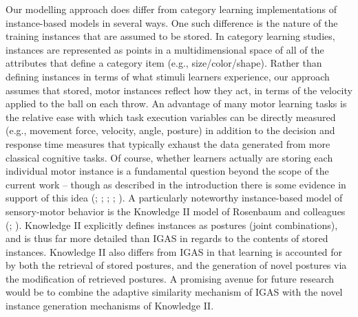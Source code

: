 \documentclass[
  11pt,
  letterpaper,
]{article}
\begin{document}
Our modelling approach does differ from category learning
implementations of instance-based models in several ways. One such
difference is the nature of the training instances that are assumed to
be stored. In category learning studies, instances are represented as
points in a multidimensional space of all of the attributes that define
a category item (e.g., size/color/shape). Rather than defining instances
in terms of what stimuli learners experience, our approach assumes that
stored, motor instances reflect how they act, in terms of the velocity
applied to the ball on each throw. An advantage of many motor learning
tasks is the relative ease with which task execution variables can be
directly measured (e.g., movement force, velocity, angle, posture) in
addition to the decision and response time measures that typically
exhaust the data generated from more classical cognitive tasks. Of
course, whether learners actually are storing each individual motor
instance is a fundamental question beyond the scope of the current work
-- though as described in the introduction there is some evidence in
support of this idea
(; ; ;
;
). A particularly noteworthy instance-based model of sensory-motor
behavior is the Knowledge II model of Rosenbaum and colleagues
(;
). Knowledge II explicitly defines instances as postures (joint
combinations), and is thus far more detailed than IGAS in regards to the
contents of stored instances. Knowledge II also differs from IGAS in
that learning is accounted for by both the retrieval of stored postures,
and the generation of novel postures via the modification of retrieved
postures. A promising avenue for future research would be to combine the
adaptive similarity mechanism of IGAS with the novel instance generation
mechanisms of Knowledge II.
\end{document}
